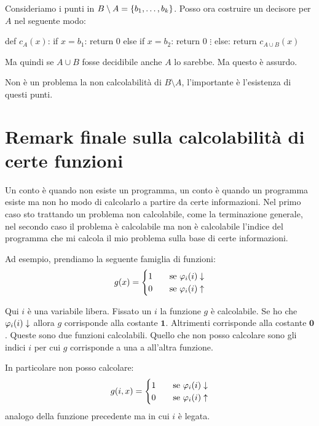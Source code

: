 Consideriamo i punti in $B \setminus A = \{b_{1},\dotsc,b_{k}\}$. Posso ora costruire un decisore
per $A$ nel seguente modo:
\begin{python}
def $c_{A}(x)$:
    if $x = b_{1}$:
        return 0
    else if $x = b_{2}$:
        return 0
    $\vdots$
    else:
        return $c_{A \cup B}(x)$
\end{python}

Ma quindi se $A \cup B$ fosse decidibile anche $A$ lo sarebbe. Ma questo è assurdo.

Non è un problema la non calcolabilità di $B \setminus A$, l'importante è l'esistenza di questi
punti.

\section{Remark finale sulla calcolabilità di certe funzioni}

Un conto è quando non esiste un programma, un conto è quando un programma esiste ma
non ho modo di calcolarlo a partire da certe informazioni. Nel primo caso sto trattando un problema
non calcolabile, come la terminazione generale, nel secondo caso il problema è calcolabile ma non è
calcolabile l'indice del programma che mi calcola il mio problema sulla base di certe informazioni.

Ad esempio, prendiamo la seguente famiglia di funzioni:
\begin{equation*}
    g(x) =
    \begin{cases}
        1 \quad &\text{se $\varphi_{i}(i) \downarrow$} \\
        0 \quad &\text{se $\varphi_{i}(i) \uparrow$} \\
    \end{cases}
\end{equation*}

Qui $i$ è una variabile libera. Fissato un $i$ la funzione $g$ è calcolabile. Se ho che $\varphi_{i}(i)
\downarrow$ allora $g$ corrisponde alla costante $\bm{1}$. Altrimenti corrisponde alla costante
$\bm{0}$. Queste sono due funzioni calcolabili. Quello che non posso calcolare sono gli indici $i$
per cui $g$ corrisponde a una a all'altra funzione.

In particolare non posso calcolare:
\begin{equation*}
    g(i,x) =
    \begin{cases}
        1 \quad &\text{se $\varphi_{i}(i) \downarrow$} \\
        0 \quad &\text{se $\varphi_{i}(i) \uparrow$} \\
    \end{cases}
\end{equation*}
analogo della funzione precedente ma in cui $i$ è legata.
